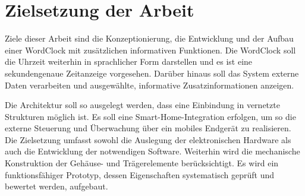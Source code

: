 \section{Zielsetzung der Arbeit}
Ziele dieser Arbeit sind die Konzeptionierung, die Entwicklung und der Aufbau einer WordClock mit zusätzlichen informativen Funktionen. 
Die WordClock soll die Uhrzeit weiterhin in sprachlicher Form darstellen und es ist eine sekundengenaue Zeitanzeige vorgesehen. 
Darüber hinaus soll das System externe Daten verarbeiten und ausgewählte, informative Zusatzinformationen anzeigen. 

Die Architektur soll so ausgelegt werden, dass eine Einbindung in vernetzte Strukturen möglich ist. 
Es soll eine Smart-Home-Integration erfolgen, um so die externe Steuerung und Überwachung über ein mobiles Endgerät zu realisieren. 
Die Zielsetzung umfasst sowohl die Auslegung der elektronischen Hardware als auch die Entwicklung der notwendigen Software. 
Weiterhin wird die mechanische Konstruktion der Gehäuse- und Trägerelemente berücksichtigt. 
Es wird ein funktionsfähiger Prototyp, dessen Eigenschaften systematisch geprüft und bewertet werden, aufgebaut.